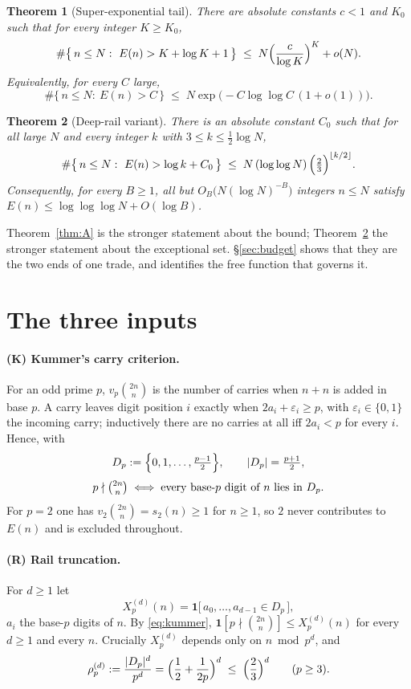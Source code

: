 \documentclass[11pt]{article}
\newtheorem{theorem}{Theorem}
\newcommand{\fl}[1]{\left\lfloor #1\right\rfloor}
\begin{document}
\begin{theorem}[Super-exponential tail]\label{thm:Ap}
There are absolute constants $c<1$ and $K_0$ such that for every integer $K\ge K_0$,
\[
\#\bigl\{\,n\le N:\ E(n)>K+\log K+1\,\bigr\}\;\le\;N\Bigl(\frac{c}{\log K}\Bigr)^{K}+o(N).
\]
Equivalently, for every $C$ large,
\[
\#\bigl\{\,n\le N:\ E(n)>C\,\bigr\}\;\le\;N\exp\bigl(-C\log\log C\,(1+o(1))\bigr).
\]
\end{theorem}

\begin{theorem}[Deep-rail variant]\label{thm:B}
There is an absolute constant $C_0$ such that for all large $N$ and every integer $k$
with $3\le k\le\tfrac12\log N$,
\[
\#\bigl\{\,n\le N:\ E(n)>\log k+C_0\,\bigr\}\;\le\;N\,(\log\log N)\,\Bigl(\tfrac23\Bigr)^{\fl{k/2}} .
\]
Consequently, for every $B\ge1$, all but $O_B\bigl(N(\log N)^{-B}\bigr)$ integers $n\le N$
satisfy $E(n)\le\log\log\log N+O(\log B)$.
\end{theorem}

Theorem~\ref{thm:A} is the stronger statement about the bound; Theorem~\ref{thm:B} the
stronger statement about the exceptional set.  \S\ref{sec:budget} shows that they are the
two ends of one trade, and identifies the free function that governs it.

\section{The three inputs}

\paragraph{(K) Kummer's carry criterion.}
For an odd prime $p$, $v_p\binom{2n}{n}$ is the number of carries when $n+n$ is added in
base $p$.  A carry leaves digit position $i$ exactly when $2a_i+\varepsilon_i\ge p$, with
$\varepsilon_i\in\{0,1\}$ the incoming carry; inductively there are no carries at all iff
$2a_i<p$ for every $i$.  Hence, with
\[
D_p:=\Bigl\{0,1,\dots,\tfrac{p-1}2\Bigr\},\qquad |D_p|=\tfrac{p+1}2,
\]
\begin{equation}\label{eq:kummer}
p\nmid\tbinom{2n}{n}\iff\text{every base-$p$ digit of $n$ lies in }D_p .
\end{equation}
For $p=2$ one has $v_2\binom{2n}{n}=s_2(n)\ge1$ for $n\ge1$, so $2$ never contributes to
$E(n)$ and is excluded throughout.

\paragraph{(R) Rail truncation.}
For $d\ge1$ let
\[
X_p^{(d)}(n)=\mathbf 1\bigl[\,a_0,\dots,a_{d-1}\in D_p\,\bigr],
\]
$a_i$ the base-$p$ digits of $n$.  By \eqref{eq:kummer},
$\mathbf 1[p\nmid\binom{2n}{n}]\le X_p^{(d)}(n)$ for every $d\ge1$ and every $n$.
Crucially $X_p^{(d)}$ depends only on $n\bmod p^d$, and
\begin{equation}\label{eq:density}
\rho_p^{(d)}:=\frac{|D_p|^d}{p^d}=\Bigl(\frac12+\frac1{2p}\Bigr)^{d}
\;\le\;\Bigl(\frac23\Bigr)^{d}\qquad(p\ge3).
\end{equation}
\end{document}
